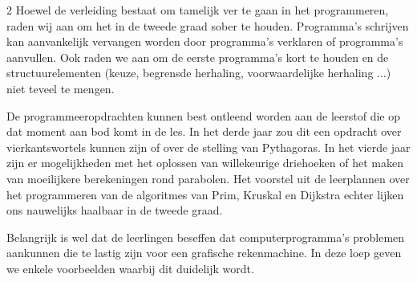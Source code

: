 \begin{multicols}{2}
	Hoewel de verleiding bestaat om tamelijk ver te gaan in het programmeren, raden wij aan om het in de tweede graad sober te houden. Programma's schrijven kan aanvankelijk vervangen worden door programma's verklaren of programma's aanvullen. Ook raden we aan om de eerste programma's kort te houden en de structuurelementen (keuze, begrensde herhaling, voorwaardelijke herhaling ...) niet teveel te mengen. 
	
	De programmeeropdrachten kunnen best ontleend worden aan de leerstof die op dat moment aan bod komt in de les. In het derde jaar zou dit een opdracht over vierkantswortels kunnen zijn of over de stelling van Pythagoras. In het vierde jaar zijn er mogelijkheden met het oplossen van willekeurige driehoeken of het maken van moeilijkere berekeningen rond parabolen. Het voorstel uit de leerplannen over het programmeren van de algoritmes van Prim, Kruskal en Dijkstra echter lijken ons nauwelijks haalbaar in de tweede graad.
	
	Belangrijk is wel dat de leerlingen beseffen dat computerprogramma's problemen aankunnen die te lastig zijn voor een grafische rekenmachine. In deze loep geven we enkele voorbeelden waarbij dit duidelijk wordt.
	
	\end{multicols}
	
